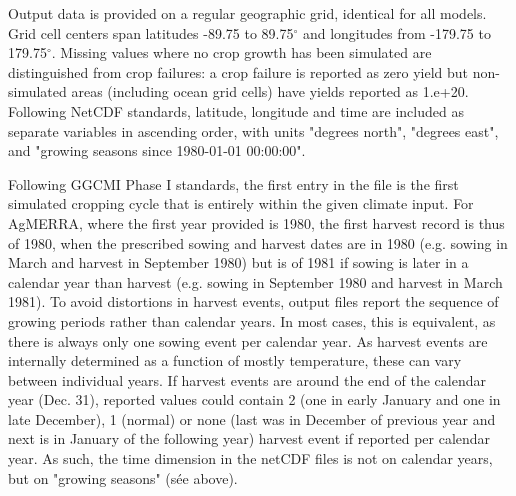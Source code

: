 \documentclass[gmd, manuscript]{copernicus} %
\begin{document}
Output data is provided on a regular geographic grid, identical for all models. 
Grid cell centers span latitudes -89.75 to 89.75$^{\circ}$ and longitudes from -179.75 to 179.75$^{\circ}$. 
Missing values  where no crop growth has been simulated are distinguished from crop failures: a crop failure is reported as zero yield but non-simulated areas (including ocean grid cells) have yields reported as 1.e+20. 
Following NetCDF standards, latitude, longitude and time are included as separate variables in ascending order, with
units "degrees north", "degrees east", and "growing seasons since 1980-01-01 00:00:00". 

Following GGCMI Phase I standards, the first entry in the file is the first simulated cropping cycle that is entirely within the given climate input. 
For AgMERRA, where the first year provided is 1980, the first harvest record is thus of 1980, when the prescribed sowing and harvest dates are in 1980 (e.g. sowing in March and harvest in September 1980) but is of 1981 if sowing is later in a calendar year than harvest (e.g. sowing in September 1980 and harvest in March 1981). 
To avoid distortions in harvest events, output files report the sequence of growing periods rather than calendar years. 
In most cases, this is equivalent, as there is always only one sowing event per calendar year.
As harvest events are internally determined as a function of mostly temperature, these can vary between individual years. 
If harvest events are around the end of the calendar year (Dec. 31), reported values could contain 2 (one in early January and one in late December), 1 (normal) or none (last was in December of previous year and next is in January of the following year) harvest event if reported per calendar year.
As such, the time dimension in the netCDF files is not on calendar years, but on "growing seasons" (sée above).
\end{document}

